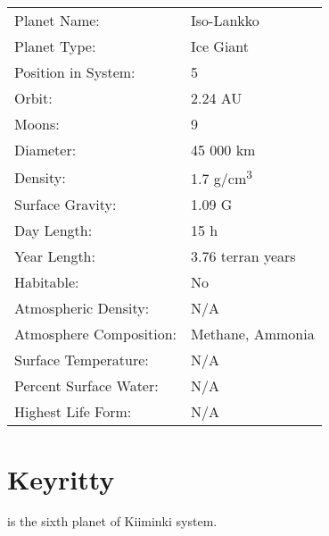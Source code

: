 \documentclass{tufte-book}
\begin{document}
\bigskip
\begin{minipage}{\textwidth}
\begin{center}
\begin{tabular}{ll}
\toprule
Planet Name: & Iso-Lankko \\
Planet Type: & Ice Giant \\
Position in System: & 5 \\
Orbit: & 2.24 AU \\
Moons: & 9 \\
Diameter: & 45 000 km \\
Density: & 1.7 g/cm\textsuperscript{3} \\
Surface Gravity: & 1.09 G \\
Day Length: & 15 h \\
Year Length: & 3.76 terran years \\
Habitable: & No \\
\quad Atmospheric Density: & N/A \\
\quad Atmosphere Composition: & Methane, Ammonia \\
\quad Surface Temperature: & N/A \\
\quad Percent Surface Water: & N/A \\
\quad Highest Life Form: & N/A \\

\bottomrule
\end{tabular}
\end{center}
\end{minipage}


\section{Keyritty}

 is the sixth planet of Kiiminki system.
\end{document}
